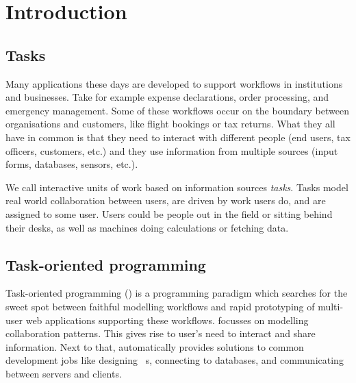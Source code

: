 


\section{Introduction}


\subsection{Tasks}

Many applications these days are developed to support workflows in institutions and businesses.
Take for example expense declarations, order processing, and emergency management.
Some of these workflows occur on the boundary between organisations and customers,
like flight bookings or tax returns.
What they all have in common is
that they need to interact with different people (end users, tax officers, customers, etc.)
and they use information from multiple sources (input forms, databases, sensors, etc.).

We call interactive units of work based on information sources \emph{tasks}.
Tasks model real world collaboration between users,
are driven by work users do,
and are assigned to some user.
Users could be people out in the field or sitting behind their desks,
as well as machines doing calculations or fetching data.



\subsection{Task-oriented programming}

Task-oriented programming (\TOP) is a programming paradigm which searches for the sweet spot between faithful modelling workflows
and rapid prototyping of multi-user web applications supporting these workflows.
\TOP focusses on modelling collaboration patterns.
This gives rise to user's need to interact and share information.
Next to that, \TOP automatically provides solutions to common development jobs like designing \GUI\ s, connecting to databases, and communicating between servers and clients.

